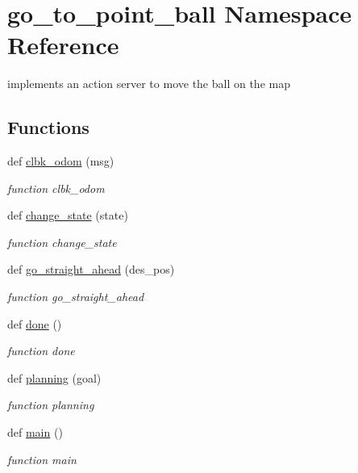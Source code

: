 \hypertarget{namespacego__to__point__ball}{}\section{go\+\_\+to\+\_\+point\+\_\+ball Namespace Reference}
\label{namespacego__to__point__ball}


implements an action server to move the ball on the map  


\subsection*{Functions}
\begin{DoxyCompactItemize}
\item 
def \hyperlink{namespacego__to__point__ball_a8b53c165c87e66822f50ab5daebc14dc}{clbk\+\_\+odom} (msg)
\begin{DoxyCompactList}\small\item\em function clbk\+\_\+odom \end{DoxyCompactList}\item 
def \hyperlink{namespacego__to__point__ball_ac5839fd3601d15749a1e1a28939b2c68}{change\+\_\+state} (state)
\begin{DoxyCompactList}\small\item\em function change\+\_\+state \end{DoxyCompactList}\item 
def \hyperlink{namespacego__to__point__ball_aecbf76a67251ff6a3a0840bb61e1c581}{go\+\_\+straight\+\_\+ahead} (des\+\_\+pos)
\begin{DoxyCompactList}\small\item\em function go\+\_\+straight\+\_\+ahead \end{DoxyCompactList}\item 
def \hyperlink{namespacego__to__point__ball_ab92c8b4240f09ff0b5d960c748ade799}{done} ()
\begin{DoxyCompactList}\small\item\em function done \end{DoxyCompactList}\item 
def \hyperlink{namespacego__to__point__ball_ab0e05a6be4adc81f80b5635d9bd692d1}{planning} (goal)
\begin{DoxyCompactList}\small\item\em function planning \end{DoxyCompactList}\item 
def \hyperlink{namespacego__to__point__ball_a4d4c016b6bb12c612710a2d39ade3465}{main} ()
\begin{DoxyCompactList}\small\item\em function main \end{DoxyCompactList}\end{DoxyCompactItemize}
